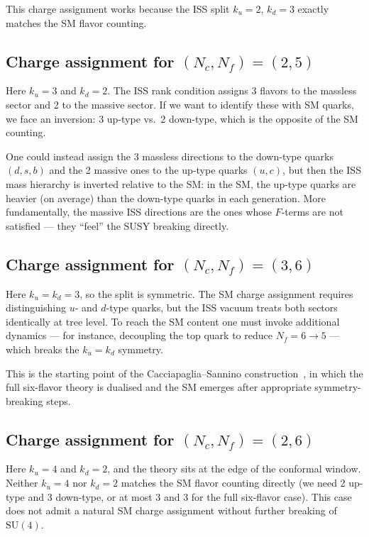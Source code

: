 \documentclass[11pt,a4paper]{article}
\newcommand{\Nf}{N_{\!f}}
\newcommand{\Nc}{N_{\!c}}
\begin{document}
This charge assignment works because the ISS split $k_u = 2$,
$k_d = 3$ exactly matches the SM flavor counting.

\subsection{Charge assignment for $(\Nc,\Nf) = (2,5)$}

Here $k_u = 3$ and $k_d = 2$.
The ISS rank condition assigns 3 flavors to the massless sector and
2 to the massive sector.  If we want to identify these with SM
quarks, we face an inversion: 3 up-type vs.\ 2 down-type, which is
the opposite of the SM counting.

One could instead assign the 3 massless directions to the down-type
quarks $(d,s,b)$ and the 2 massive ones to the up-type quarks
$(u,c)$, but then the ISS mass hierarchy is inverted relative to the
SM: in the SM, the up-type quarks are heavier (on average) than the
down-type quarks in each generation.  More fundamentally, the massive
ISS directions are the ones whose $F$-terms are not satisfied ---
they ``feel'' the SUSY breaking directly.

\subsection{Charge assignment for $(\Nc,\Nf) = (3,6)$}

Here $k_u = k_d = 3$, so the split is symmetric.
The SM charge assignment requires distinguishing $u$- and $d$-type
quarks, but the ISS vacuum treats both sectors identically at tree
level.  To reach the SM content one must invoke additional dynamics
--- for instance, decoupling the top quark to reduce
$\Nf = 6 \to 5$ --- which breaks the $k_u = k_d$ symmetry.

This is the starting point of the Cacciapaglia--Sannino
construction~\cite{CacciapagliaSannino2024}, in which the full
six-flavor theory is dualised and the SM emerges after appropriate
symmetry-breaking steps.

\subsection{Charge assignment for $(\Nc,\Nf) = (2,6)$}

Here $k_u = 4$ and $k_d = 2$, and the theory sits at the edge of
the conformal window.  Neither $k_u = 4$ nor $k_d = 2$ matches
the SM flavor counting directly (we need 2 up-type and 3 down-type,
or at most 3 and 3 for the full six-flavor case).  This case does
not admit a natural SM charge assignment without further breaking of
$\mathrm{SU}(4)$.
\end{document}
